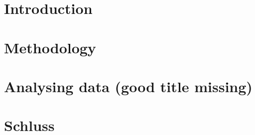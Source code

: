 \chapter{Introduction}
	
	
\chapter{Methodology}

	
	
	
		
\chapter{Analysing data (good title missing)}

	
					
		
\chapter{Schluss}

	
		
		
%	

% 		


